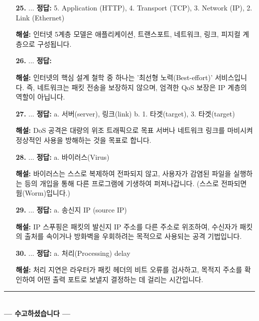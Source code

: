 \documentclass[a4paper, 10pt]{article}
\newcommand*\circled[1]{\tikz[baseline=(char.base)]{
  \node[shape=circle,draw,inner sep=0.7pt,minimum size=0.7em,line width=0.5pt] (char) {\small #1};}}
\newcommand{\sectionbox}[1]{
  \vspace{0.5em}
  \noindent\fbox{\textbf{#1}}
  \vspace{0.5em}
}
\begin{document}
\begin{enumerate}[itemsep=2.5em, leftmargin=2em, label={}]
\item[\textbf{25.}] ...
\vspace{0.5em}
\noindent\textbf{정답:} 5. Application (HTTP), 4. Transport (TCP), 3. Network (IP), 2. Link (Ethernet) \par
\small\textbf{해설:} 인터넷 5계층 모델은 애플리케이션, 트랜스포트, 네트워크, 링크, 피지컬 계층으로 구성됩니다.

\item[] \sectionbox{VI. 보안 및 기타 (5문제)}

\item[\textbf{26.}] ...
\vspace{0.5em}
\noindent\textbf{정답: \circled{4}} \par
\small\textbf{해설:} 인터넷의 핵심 설계 철학 중 하나는 '최선형 노력(Best-effort)' 서비스입니다. 즉, 네트워크는 패킷 전송을 보장하지 않으며, 엄격한 QoS 보장은 IP 계층의 역할이 아닙니다.

\item[\textbf{27.}] ...
\vspace{0.5em}
\noindent\textbf{정답:} a. 서버(server), 링크(link) b. 1. 타겟(target), 3. 타겟(target) \par
\small\textbf{해설:} DoS 공격은 대량의 위조 트래픽으로 목표 서버나 네트워크 링크를 마비시켜 정상적인 사용을 방해하는 것을 목표로 합니다.

\item[\textbf{28.}] ...
\vspace{0.5em}
\noindent\textbf{정답:} a. 바이러스(Virus) \par
\small\textbf{해설:} 바이러스는 스스로 복제하여 전파되지 않고, 사용자가 감염된 파일을 실행하는 등의 개입을 통해 다른 프로그램에 기생하여 퍼져나갑니다. (스스로 전파되면 웜(Worm)입니다.)

\item[\textbf{29.}] ...
\vspace{0.5em}
\noindent\textbf{정답:} a. 송신지 IP (source IP) \par
\small\textbf{해설:} IP 스푸핑은 패킷의 발신지 IP 주소를 다른 주소로 위조하여, 수신자가 패킷의 출처를 속이거나 방화벽을 우회하려는 목적으로 사용되는 공격 기법입니다.

\item[\textbf{30.}] ...
\vspace{0.5em}
\noindent\textbf{정답:} a. 처리(Processing) delay \par
\small\textbf{해설:} 처리 지연은 라우터가 패킷 헤더의 비트 오류를 검사하고, 목적지 주소를 확인하여 어떤 출력 포트로 보낼지 결정하는 데 걸리는 시간입니다.

\end{enumerate}

\vfill
\begin{center}
  \rule{0.9\textwidth}{0.4pt}\\[8pt]
  {\small\textbf{--- 수고하셨습니다 ---}}\\[6pt]
\end{center}
\end{document}
